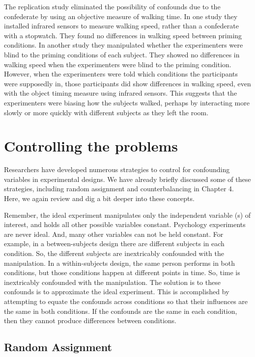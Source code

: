 The replication study eliminated the possibility of confounds due to the confederate by using an objective measure of walking time. In one study they installed infrared sensors to measure walking speed, rather than a confederate with a stopwatch. They found no differences in walking speed between priming conditions. In another study they manipulated whether the experimenters were blind to the priming conditions of each subject. They showed no differences in walking speed when the experimenters were blind to the priming condition. However, when the experimenters were told which conditions the participants were supposedly in, those participants did show differences in walking speed, even with the object timing measure using infrared sensors. This suggests that the experimenters were biasing how the subjects walked, perhaps by interacting more slowly or more quickly with different subjects as they left the room. 

\section{Controlling the problems}

Researchers have developed numerous strategies to control for confounding variables in experimental designs. We have already briefly discussed some of these strategies, including random assignment and counterbalancing in Chapter 4. Here, we again review and dig a bit deeper into these concepts. 

Remember, the ideal experiment manipulates only the independent variable (s) of interest, and holds all other possible variables constant. Psychology experiments are never ideal. And, many other variables can not be held constant. For example, in a between-subjects design there are different subjects in each condition. So, the different subjects are inextricably confounded with the manipulation. In a within-subjects design, the same person performs in both conditions, but those conditions happen at different points in time. So, time is inextricably confounded with the manipulation. The solution is to these confounds is to approximate the ideal experiment. This is accomplished by attempting to equate the confounds across conditions so that their influences are the same in both conditions. If the confounds are the same in each condition, then they cannot produce differences between conditions. 

\subsection{Random Assignment}

